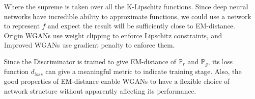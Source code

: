 Where the supreme is taken over all the K-Lipschitz functions. Since deep neural networks have incredible ability to approximate functions, we could use a network to represent $f$ and expect the result will be sufficiently close to EM-distance. Origin WGANs use weight clipping to enforce Lipschitz constraints, and Improved WGANs use gradient penalty to enforce them.

Since the Discriminator is trained to give EM-distance of $\mathbb{P}_r$ and $\mathbb{P}_g$, its loss function $d_{loss}$ can give a meaningful metric to indicate training stage. Also, the good properties of EM-distance enable WGANs to have a flexible choice of network structure without apparently affecting its performance.
